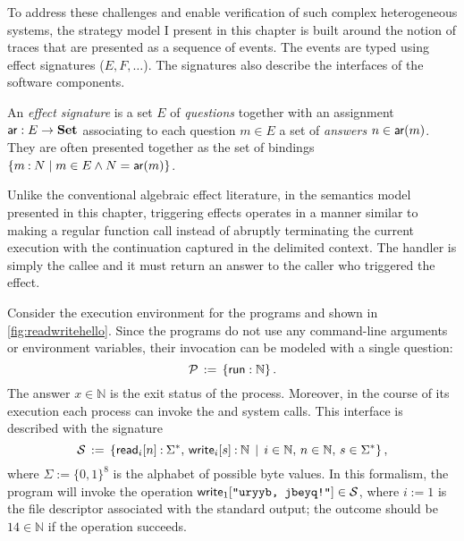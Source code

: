 To address these challenges and enable verification of such complex heterogeneous systems,
the strategy model I present in this chapter
is built around the notion of
traces
that are presented as a sequence of events.
The events are typed using
effect signatures ($E, F, \ldots$).
The signatures also describe
the interfaces of the software components.

\begin{definition}
  An \emph{effect signature} is a set $E$ of \emph{questions}
  together with an assignment $ \mathsf{ar}  : E \rightarrow \mathbf{Set}$
  associating to each question $m \in E$
  a set of \emph{answers} $n \in  \mathsf{ar} (m)$.
  They are often presented together as the set of bindings
  $\{ m \mathbin: N \mid m \in E \wedge N =  \mathsf{ar} (m) \}$.
\end{definition}

Unlike the conventional algebraic effect literature,
in the semantics model presented in this chapter,
triggering effects operates in a manner similar to
making a regular function call
instead of
abruptly terminating the current execution
with the continuation captured
in the delimited context.
The handler is simply the callee
and it must return an answer to the caller
who triggered the effect.

\begin{example}
  Consider the execution environment
  for the programs  and 
  shown in \autoref{fig:readwritehello}.
  Since the programs
  do not use any command-line arguments or environment variables,
  their invocation can be modeled with a single question:
  \[
    \mathcal{P} \, := \,
    \{  \mathsf{run}  : \mathbb{N} \}
    \,.
  \]
  The answer $x \in \mathbb{N}$ is the exit status of the process.
  Moreover, in the course of its execution
  each process can invoke the  and  system calls.
  This interface is described with the signature
  \[
    \mathcal{S} \, := \, \{
       \mathsf{read} _i[n] \mathbin: \Sigma^* , \,
       \mathsf{write} _i[s] \mathbin: \mathbb{N} \, \mid \,
      i \in \mathbb{N}, \,
      n \in \mathbb{N}, \,
      s \in \Sigma^*
    \}
    \,,
  \]
  where $\Sigma := \{0,1\}^8$ is the alphabet of possible byte values.
  In this formalism,
  the program  will invoke
  the operation
  $ \mathsf{write} _1[\texttt{"uryyb, jbeyq!"}]
  \in \mathcal{S}$,
  where $i := 1$ is the file descriptor associated with the standard output;
  the outcome should be $14 \in \mathbb{N}$
  if the operation succeeds.
\end{example}

